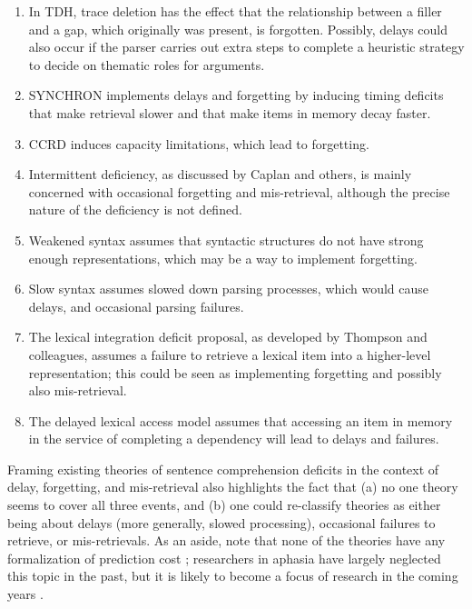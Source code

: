 \documentclass{cambridge7A}\usepackage[]{graphicx}\usepackage[]{color}
\begin{document}
\begin{enumerate}
\item
In TDH, trace deletion has the effect that the relationship between a filler and a gap, which originally was present, is forgotten. Possibly, delays could also occur if the parser carries out extra steps to complete a heuristic strategy to decide on thematic roles for arguments.
\item SYNCHRON implements delays and forgetting by inducing timing deficits that make retrieval slower and that make items in memory decay faster.
\item 
CCRD induces capacity limitations, which lead to forgetting.
\item 
Intermittent deficiency, as discussed by Caplan and others, is mainly concerned with occasional forgetting and mis-retrieval, although the precise nature of the deficiency is not defined.
\item 
Weakened syntax assumes that syntactic structures do not have strong enough representations, which may be a way to implement forgetting. 
\item Slow syntax assumes slowed down parsing processes, which would cause delays, and occasional parsing failures.
\item The lexical integration deficit proposal, as developed by Thompson and colleagues, 
assumes a failure to retrieve a lexical item into a higher-level representation; this could be seen as implementing forgetting and possibly also mis-retrieval.
\item 
The delayed lexical access model  assumes that accessing an item in memory in the service of completing a dependency will lead to delays and failures.
 \end{enumerate}


Framing existing theories of sentence comprehension deficits in the context of delay, forgetting, and mis-retrieval also highlights the fact that (a) no one theory seems to cover all three events, and (b) one could re-classify theories as either being about delays (more generally, slowed processing), occasional failures to retrieve, or mis-retrievals.
As an aside, note that none of the theories have any formalization of prediction cost \citep[e.g.,][]{Hale2001,Levy2008}; researchers in aphasia have largely neglected this topic in the past, but it is likely to become a  focus of research in the coming years \citep[see][for an interesting recent attempt using the storage cost metric from the Dependency Locality Theory]{clark12}.
\end{document}
